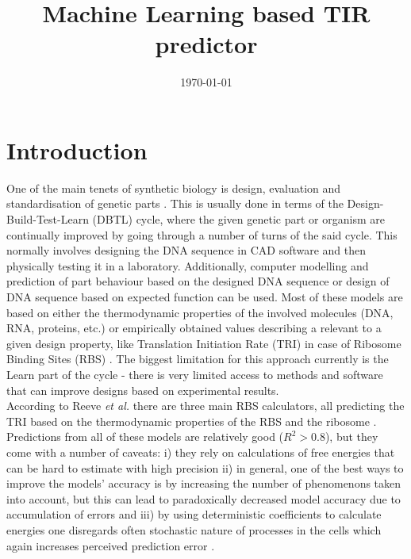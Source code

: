 \documentclass{article}
\title{Machine Learning based TIR predictor}
\author{}
\date{\today{}}
\begin{document}
\maketitle

\section{Introduction}

One of the main tenets of synthetic biology is design, evaluation and standardisation of genetic parts \cite{Brophy2014,Canton2008,Stanton2014}. This is usually done in terms of the Design-Build-Test-Learn (DBTL) cycle, where the given genetic part or organism are continually improved by going through a number of turns of the said cycle. This normally involves designing the DNA sequence in CAD software and then physically testing it in a laboratory. Additionally, computer modelling and prediction of part behaviour based on the designed DNA sequence or design of DNA sequence based on expected function can be used\cite{Yeoh2019,Nielsen2016}. Most of these models are based on either the thermodynamic properties of the involved molecules (DNA, RNA, proteins, etc.) or empirically obtained values describing a relevant to a given design property, like Translation Initiation Rate (TRI) in case of Ribosome Binding Sites (RBS) \cite{Xia1998,Chen2013,Reeve2014}. The biggest limitation for this approach currently is the Learn part of the cycle - there is very limited access to methods and software that can improve designs based on experimental results.\\
According to Reeve \emph{et al.} there are three main RBS calculators, all predicting the TRI based on the thermodynamic properties of the RBS and the ribosome \cite{Seo2013,Na2010,Salis2009}. Predictions from all of these models are relatively good ($R^2 >0.8$), but they come with a number of caveats: i) they rely on calculations of free energies that can be hard to estimate with high precision ii) in general, one of the best ways to improve the models' accuracy is by increasing the number of phenomenons taken into account, but this can lead to paradoxically decreased model accuracy due to accumulation of errors \cite{EspahBorujeni2016} and iii) by using deterministic coefficients to calculate energies one disregards often stochastic nature of processes in the cells which again increases perceived prediction error \cite{Goss1998}. \\
\end{document}
